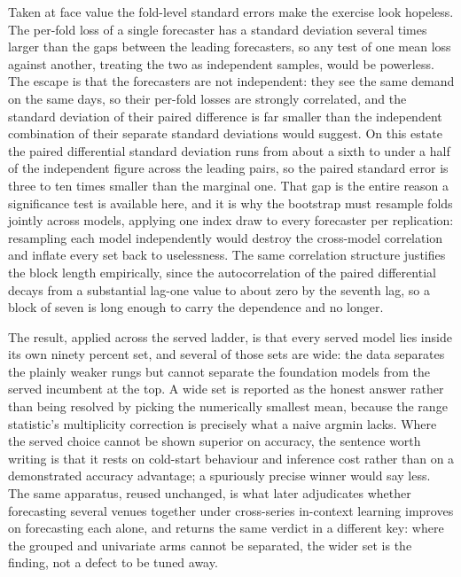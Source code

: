 Taken at face value the fold-level standard errors make the exercise look hopeless. The
per-fold loss of a single forecaster has a standard deviation several times larger than the
gaps between the leading forecasters, so any test of one mean loss against another, treating
the two as independent samples, would be powerless. The escape is that the forecasters are not
independent: they see the same demand on the same days, so their per-fold losses are strongly
correlated, and the standard deviation of their paired difference is far smaller than the
independent combination of their separate standard deviations would suggest. On this estate the
paired differential standard deviation runs from about a sixth to under a half of the
independent figure across the leading pairs, so the paired standard error is three to ten times
smaller than the marginal one. That gap is the entire reason a significance test is available
here, and it is why the bootstrap must resample folds jointly across models, applying one index
draw to every forecaster per replication: resampling each model independently would destroy the
cross-model correlation and inflate every set back to uselessness. The same correlation
structure justifies the block length empirically, since the autocorrelation of the paired
differential decays from a substantial lag-one value to about zero by the seventh lag, so a
block of seven is long enough to carry the dependence and no longer.

The result, applied across the served ladder, is that every served model lies inside its own
ninety percent set, and several of those sets are wide: the data separates the plainly weaker
rungs but cannot separate the foundation models from the served incumbent at the top. A wide
set is reported as the honest answer rather than being resolved by picking the numerically
smallest mean, because the range statistic's multiplicity correction is precisely what a naive
argmin lacks. Where the served choice cannot be shown superior on accuracy, the sentence worth
writing is that it rests on cold-start behaviour and inference cost rather than on a
demonstrated accuracy advantage; a spuriously precise winner would say less. The same
apparatus, reused unchanged, is what later adjudicates whether forecasting several venues
together under cross-series in-context learning improves on forecasting each alone, and returns
the same verdict in a different key: where the grouped and univariate arms cannot be
separated, the wider set is the finding, not a defect to be tuned away.

